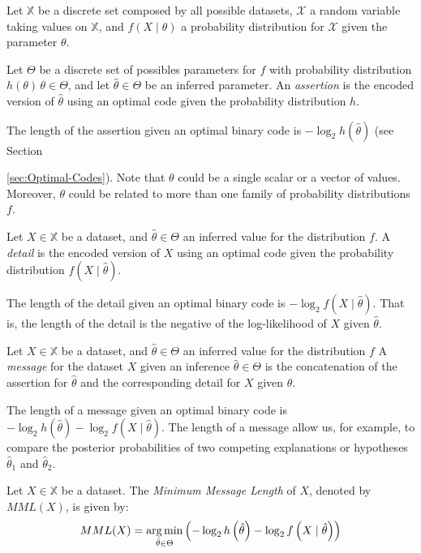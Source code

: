 Let $\mathbb{X}$ be a discrete set composed by all possible datasets, $\mathcal{X}$ a random variable taking values on $\mathbb{X}$, and $f(X \mid \theta)$ a probability distribution for $\mathcal{X}$ given the parameter $\theta$.

\begin{definition}
    Let $\Theta$ be a discrete set of possibles parameters for $f$ with probability distribution $h(\theta) \, \theta \in \Theta$, and let $\hat\theta \in \Theta$ be an inferred parameter. An \emph{assertion} is the encoded version of $\hat\theta$ using an optimal code given the probability distribution $h$.
\end{definition}

The length of the assertion given an optimal binary code is $- \log_2 h(\hat\theta)$ (see Section {\ref{sec:Optimal-Codes}). Note that $\theta$ could be a single scalar or a vector of values. Moreover, $\theta$ could be related to more than one family of probability distributions $f$.

\begin{definition}
    Let $X \in \mathbb{X}$ be a dataset, and $\hat \theta \in \Theta$ an inferred value for the distribution $f$. A \emph{detail} is the encoded version of $X$ using an optimal code given the probability distribution $f(X \mid \hat\theta)$.
\end{definition}

The length of the detail given an optimal binary code is $- \log_2 f( X \mid \hat\theta )$. That is, the length of the detail is the negative of the log-likelihood of $X$ given $\hat\theta$.

\begin{definition}
    Let $X \in \mathbb{X}$ be a dataset, and $\hat \theta \in \Theta$ an inferred value for the distribution $f$ A \emph{message} for the dataset $X$ given an inference $\hat\theta \in \Theta$ is the concatenation of the assertion for $\hat\theta$ and the corresponding detail for $X$ given $\theta$.
\end{definition}

The length of a message given an optimal binary code is $- \log_2 h \left( \hat\theta \right) - \log_2 f \left( X \mid \hat\theta \right)$. The length of a message allow us, for example, to compare the posterior probabilities of two competing explanations or hypotheses $\hat\theta_1$ and $\hat\theta_2$.

\begin{definition}
    Let $X \in \mathbb{X}$ be a dataset. The \emph{Minimum Message Length} of $X$, denoted by $MML(X)$, is given by:
    \[
        MML(X) = \operatorname*{arg\,min}_{\hat\theta \in \Theta} \left( - \log_2 h \left( \hat\theta \right) - \log_2 f \left( X \mid \hat\theta \right) \right)
    \]


\end{definition}}
